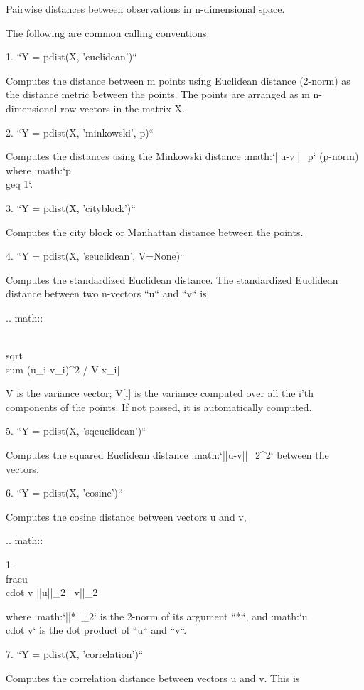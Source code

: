 \begin{DoxyVerb}Pairwise distances between observations in n-dimensional space.

The following are common calling conventions.

1. ``Y = pdist(X, 'euclidean')``

   Computes the distance between m points using Euclidean distance
   (2-norm) as the distance metric between the points. The points
   are arranged as m n-dimensional row vectors in the matrix X.

2. ``Y = pdist(X, 'minkowski', p)``

   Computes the distances using the Minkowski distance
   :math:`||u-v||_p` (p-norm) where :math:`p \\geq 1`.

3. ``Y = pdist(X, 'cityblock')``

   Computes the city block or Manhattan distance between the
   points.

4. ``Y = pdist(X, 'seuclidean', V=None)``

   Computes the standardized Euclidean distance. The standardized
   Euclidean distance between two n-vectors ``u`` and ``v`` is

   .. math::

      \\sqrt{\\sum {(u_i-v_i)^2 / V[x_i]}}


   V is the variance vector; V[i] is the variance computed over all
   the i'th components of the points.  If not passed, it is
   automatically computed.

5. ``Y = pdist(X, 'sqeuclidean')``

   Computes the squared Euclidean distance :math:`||u-v||_2^2` between
   the vectors.

6. ``Y = pdist(X, 'cosine')``

   Computes the cosine distance between vectors u and v,

   .. math::

      1 - \\frac{u \\cdot v}
               {{||u||}_2 {||v||}_2}

   where :math:`||*||_2` is the 2-norm of its argument ``*``, and
   :math:`u \\cdot v` is the dot product of ``u`` and ``v``.

7. ``Y = pdist(X, 'correlation')``

   Computes the correlation distance between vectors u and v. This is


\end{DoxyVerb}

